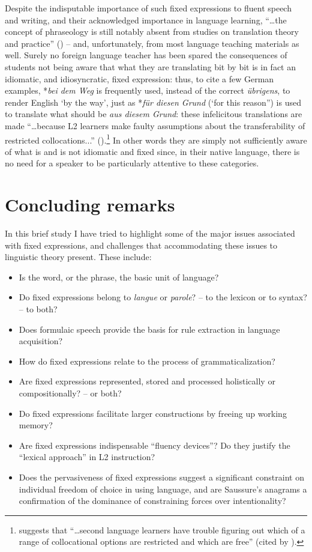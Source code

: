 \documentclass[output=paper]{langsci/langscibook}
\begin{document}
Despite the indisputable importance of such fixed expressions to fluent speech and writing, and their acknowledged importance in language learning, “…the concept of phraseology is still notably absent from studies on translation theory and practice” (\citealt[xxiv]{granger_phraseology:_2008}) – and, unfortunately, from most language teaching materials as well. Surely no foreign language teacher has been spared the consequences of students not being aware that what they are translating bit by bit is in fact an idiomatic, and idiosyncratic, fixed expression: thus, to cite a few German examples, *\textit{bei dem  Weg} is frequently used, instead of the correct \textit{übrigens}, to render English `by the way', just as *\textit{für diesen Grund} (‘for this reason'') is used to translate what should be \textit{aus diesem Grund}: these infelicitous translations are made “…because L2 learners make faulty assumptions about the transferability of restricted collocations...” (\citealt[833]{kim_frequency_2012}).\footnote{\citet[34]{howarth_phraseology_1998} suggests that “…second language learners have trouble figuring out which of a range of collocational options are restricted and which are free” (cited by \citealt[833]{kim_frequency_2012}).} In other words they are simply not sufficiently aware of what is and is not idiomatic and fixed since, in their native language, there is no need for a speaker to be particularly attentive to these categories.

\section{Concluding remarks}
In this brief study I have tried to highlight some of the major issues associated with fixed expressions, and challenges that accommodating these issues to linguistic theory present. These include:

\begin{itemize}
\item Is the word, or the phrase, the basic unit of language?
\item Do fixed expressions belong to \textit{langue} or \textit{parole}? – to the lexicon or to syntax? – to both? 
\item Does formulaic speech provide the basis for rule extraction in language acquisition?
\item How do fixed expressions relate to the process of grammaticalization?
\item Are fixed expressions represented, stored and processed holistically or compositionally? – or both?
\item Do fixed expressions facilitate larger constructions by freeing up working memory?
\item Are fixed expressions indispensable ``fluency devices''? Do they justify the ``lexical approach'' in L2 instruction?
\item Does the pervasiveness of fixed expressions suggest a significant cons\-traint on individual freedom of choice in using language, and are Saussure’s anagrams a confirmation of the dominance of constraining forces over intentionality?
\end{itemize}
\end{document}
